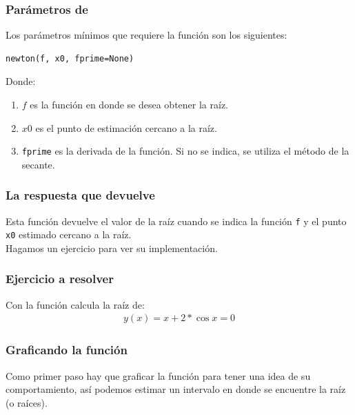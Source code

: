 \documentclass[12pt]{beamer}
\begin{document}
\begin{frame}[fragile]
\frametitle{Parámetros de }
Los parámetros mínimos que requiere la función son los siguientes:
\pause
\begin{verbatim}
newton(f, x0, fprime=None)
\end{verbatim}
\pause
Donde:
\begin{enumerate}[<+->]
\item $f$ es la función en donde se desea obtener la raíz.
\item $x0$ es el punto de estimación cercano a la raíz.
\item \texttt{fprime} es la derivada de la función. Si no se indica, se utiliza el método de la secante.
\end{enumerate}
\end{frame}
\begin{frame}
\frametitle{La respuesta que devuelve}
Esta función  devuelve el valor de la raíz cuando se indica la función \texttt{f} y el punto \texttt{x0} estimado cercano a la raíz.
\\
\bigskip
\pause
Hagamos un ejercicio para ver su implementación.
\end{frame}
\begin{frame}
\frametitle{Ejercicio a resolver}
Con la función  calcula la raíz de:
\begin{align*}
y (x) = x + 2 * \cos x = 0
\end{align*}
\end{frame}
\begin{frame}
\frametitle{Graficando la función}
Como primer paso hay que graficar la función para tener una idea de su comportamiento, así podemos estimar un intervalo en donde se encuentre la raíz (o raíces).
\end{frame}
\end{document}
